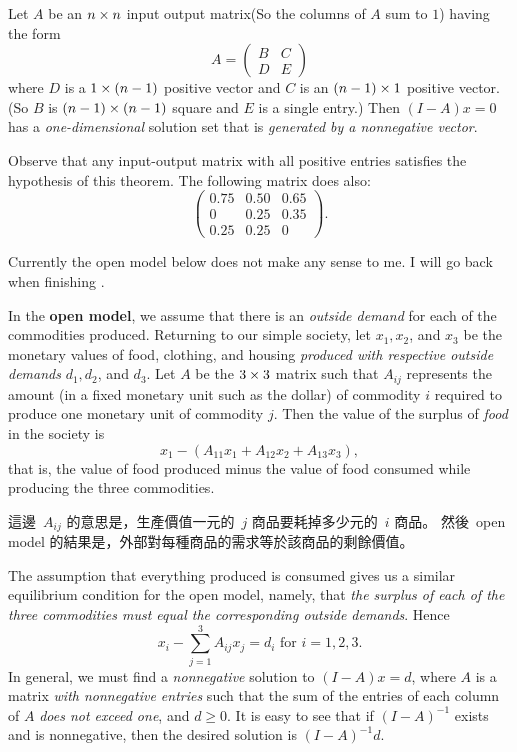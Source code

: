 \begin{theorem} \label{thm 3.12}
Let \(A\) be an \(n \times n\) input output matrix(So the columns of \(A\) sum to \(1\)) having the form
\[
    A = \begin{pmatrix} B & C \\ D & E \end{pmatrix}
\]
where \(D\) is a \(1 \times (n - 1)\) positive vector and \(C\) is an \((n - 1) \times 1\) positive vector.
(So \(B\) is \((n - 1) \times (n - 1)\) square and \(E\) is a single entry.)
Then \((I - A)x = 0\) has a \emph{one-dimensional} solution set that is \emph{generated by a nonnegative vector}.
\end{theorem}

Observe that any input-output matrix with all positive entries satisfies the hypothesis of this theorem. The following matrix does also:
\[
    \begin{pmatrix}
        0.75 & 0.50 & 0.65 \\
        0    & 0.25 & 0.35 \\
        0.25 & 0.25 & 0
    \end{pmatrix}.
\]

\TODOREF{}
\begin{note}
Currently the open model below does not make any sense to me.
I will go back when finishing .
\end{note}

In the \textbf{open model}, we assume that there is an \emph{outside demand} for each of the commodities produced.
Returning to our simple society, let \(x_1, x_2\), and \(x_3\) be the monetary values of food, clothing, and housing \emph{produced with respective outside demands} \(d_1, d_2\), and \(d_3\).
Let \(A\) be the \(3 \times 3\) matrix such that \(A_{ij}\) represents the amount (in a fixed monetary unit such as the dollar) of commodity \(i\) required to produce one monetary unit of commodity \(j\).
Then the value of the surplus of \emph{food} in the society is
\[
    x_1 - (A_{11} x_1 + A_{12} x_2 + A_{13} x_3),
\]
that is, the value of food produced minus the value of food consumed while producing the three commodities.

\begin{note}
這邊\ \(A_{ij}\) 的意思是，生產價值一元的\ \(j\) 商品要耗掉多少元的\ \(i\) 商品。
然後\ open model 的結果是，外部對每種商品的需求等於該商品的剩餘價值。
\end{note}

The assumption that everything produced is consumed gives us a similar equilibrium condition for the open model, namely,
that \emph{the surplus of each of the three commodities must equal the corresponding outside demands}.
Hence
\[
    x_i - \sum_{j = 1}^3 A_{ij} x_j = d_i \text{ for } i = 1, 2, 3.
\]
In general, we must find a \emph{nonnegative} solution to \((I - A)x = d\), where \(A\) is a matrix \emph{with nonnegative entries} such that the sum of the entries of each column of \(A\) \emph{does not exceed one}, and \(d \ge 0\).
It is easy to see that if \((I - A)^{-1}\) exists and is nonnegative, then the desired solution is \((I - A)^{-1}d\).

